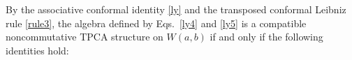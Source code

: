 \documentclass[11pt,letterpaper,reqno]{amsart}
\theoremstyle{definition}
\numberwithin{equation}{section}
\begin{document}
By the associative conformal identity \eqref{ly} and the transposed conformal Leibniz rule \eqref{rule3}, the algebra defined by Eqs.~\eqref{ly4} and \eqref{ly5} is a compatible noncommutative TPCA structure on $W(a,b)$ if and only if the following identities hold:
\end{document}
